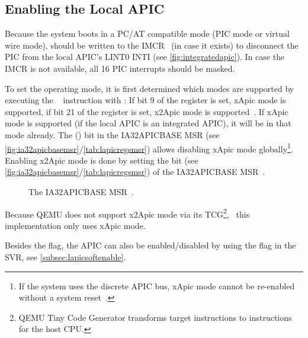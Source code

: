 \subsection{Enabling the Local APIC}
\label{subsec:lapicenable}

Because the system boots in a PC/AT compatible mode (PIC mode or virtual wire mode),  should be written to the IMCR~\autocite[sec.~3.6.2.1]{mpspec} (in case it exists) to disconnect the PIC from the local APIC's LINT0 INTI (see \autoref{fig:integratedapic}).
In case the IMCR is not available, all 16 PIC interrupts should be masked.

To set the operating mode, it is first determined which modes are supported by executing the ~\autocite{x86isa} instruction with : If bit 9 of the  register is set, xApic mode is supported, if bit 21 of the  register is set, x2Apic mode is supported~\autocite[sec.~5.1.2]{cpuid}.
If xApic mode is supported (if the local APIC is an integrated APIC), it will be in that mode already.
The  () bit in the IA32\textunderscore{}APIC\textunderscore{}BASE MSR (see \autoref{fig:ia32apicbasemsr}/\autoref{tab:lapicregsmsr}) allows disabling xApic mode globally\footnote{
  If the system uses the discrete APIC bus, xApic mode cannot be re-enabled without a system reset~\autocite[sec.~3.11.4.3]{ia32}.}.
Enabling x2Apic mode is done by setting the  bit (see \autoref{fig:ia32apicbasemsr}/\autoref{tab:lapicregsmsr}) of the IA32\textunderscore{}APIC\textunderscore{}BASE MSR~\autocite[sec.~3.11.4.3]{ia32}.

\begin{figure}[h]
  \centering
  \begin{subfigure}[b]{0.7\textwidth}
    
  \end{subfigure}
  \caption{The IA32\textunderscore{}APIC\textunderscore{}BASE MSR~\autocite[sec.~3.11.4.4]{ia32}.}
  \label{fig:ia32apicbasemsr}
\end{figure}

Because QEMU does not support x2Apic mode via its TCG\footnote{
  QEMU Tiny Code Generator transforms target instructions to instructions for the host CPU.},
\ this implementation only uses xApic mode.

Besides the  flag, the APIC can also be enabled/disabled by using the  flag in the SVR, see \autoref{subsec:lapicsoftenable}.

